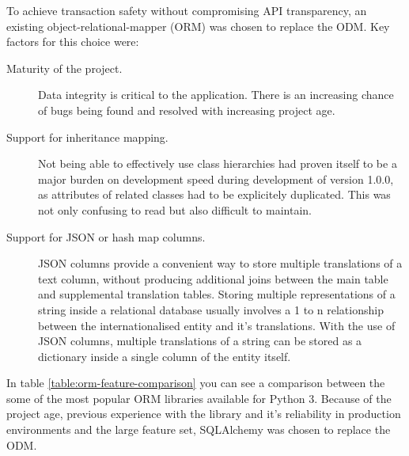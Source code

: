 \documentclass[a4paper,11pt]{article}
\begin{document}
           To achieve transaction safety without compromising API transparency, an existing
           object-relational-mapper (ORM) was chosen to replace the ODM. Key factors for this choice
           were:

           \begin{description}
               \item[Maturity of the project.] Data integrity is critical to the application. There is an
               increasing chance of bugs being found and resolved with increasing project age.
               \item[Support for inheritance mapping.] Not being able to effectively use class hierarchies 
               had proven itself to be a major burden on development speed during development of version 
               1.0.0, as attributes of related classes had to be explicitely duplicated. 
               This was not only confusing to read but also difficult to maintain. 
               \item[Support for JSON or hash map columns.] JSON columns provide a convenient way to store multiple 
               translations of a text column, without producing additional joins between the main table and
               supplemental translation tables. Storing multiple representations of a string
               inside a relational database usually involves a 1 to n relationship between
               the internationalised entity and it's translations. With the use of JSON columns,
               multiple translations of a string can be stored as a dictionary inside a single
               column of the entity itself.
           \end{description}

           In table \ref{table:orm-feature-comparison} you can see a comparison between the some of the most
           popular ORM libraries available for Python 3. Because of the project age, previous experience
           with the library and it's reliability in production environments and the large
           feature set, SQLAlchemy was chosen to replace the ODM.
\end{document}
